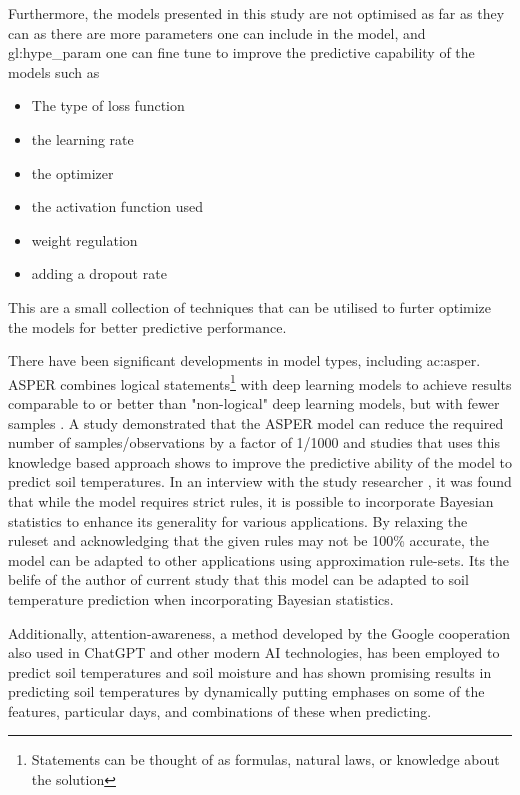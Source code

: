 Furthermore, the models presented in this study are not optimised as far as they can as there are more parameters one can include in the model, and \gls{gl:hype_param} one can fine tune to improve the predictive capability of the models such as
\begin{itemize}
	\item The type of loss function
	\item the learning rate
	\item the optimizer
	\item the activation function used
	\item weight regulation
	\item adding a dropout rate
\end{itemize}
This are a small collection of techniques that can be utilised to furter optimize the models for better predictive performance. 

There have been significant developments in model types, including \acrfull{ac:asper}. ASPER combines logical statements\footnote{Statements can be thought of as formulas, natural laws, or knowledge about the solution} with deep learning models to achieve results comparable to or better than "non-logical" deep learning models, but with fewer samples \cite{le_asper_2023}. A study demonstrated that the ASPER model can reduce the required number of samples/observations by a factor of 1/1000 \cite{machot_bridging_2023} and studies that uses this knowledge based approach shows to improve the predictive ability of the model to predict soil temperatures\cite{abimbola_knowledge-guided_2021,alizamir_advanced_2020}. In an interview with the study researcher \cite{fadi_al_machot_discussion_2024}, it was found that while the model requires strict rules, it is possible to incorporate Bayesian statistics to enhance its generality for various applications. By relaxing the ruleset and acknowledging that the given rules may not be 100\% accurate, the model can be adapted to other applications using approximation rule-sets. Its the belife of the author of current study that this model can be adapted to soil temperature prediction when incorporating Bayesian statistics.

Additionally, attention-awareness, a method developed by the Google cooperation \cite{vaswani_attention_2017} also used in ChatGPT and other modern AI technologies, has been employed to predict soil temperatures and soil moisture\cite{li_attention-aware_2022} and has shown promising results in predicting soil temperatures by dynamically putting emphases on some of the features, particular days, and combinations of these when predicting. 